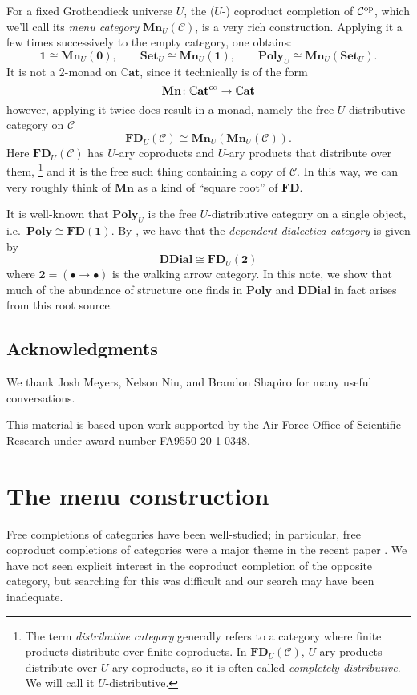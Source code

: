 \documentclass[11pt, one side, article]{memoir}
\theoremstyle{definition}
\theoremstyle{plain}
\newcommand{\cat}[1]{\mathcal{#1}}%
\newcommand{\Cat}[1]{\mathbf{#1}}%
\newcommand{\op}{^\tn{op}}
\newcommand{\co}{^\tn{co}}
\newcommand{\tn}[1]{\textnormal{#1}}
\newcommand{\smset}{\Cat{Set}}
\newcommand{\smcat}{\mathbb{C}\Cat{at}}
\newcommand{\poly}{\Cat{Poly}}
\newcommand{\0}{\textsf{0}}
\newcommand{\1}{\tn{\textsf{1}}}
\newcommand{\2}{\tn{\textsf{2}}}
\newcommand{\3}{\tn{\textsf{3}}}
\newcommand{\4}{\tn{\textsf{4}}}
\newcommand{\5}{\tn{\textsf{5}}}
\newcommand{\6}{\tn{\textsf{6}}}
\newcommand{\7}{\tn{\textsf{7}}}
\newcommand{\8}{\tn{\textsf{8}}}
\newcommand{\9}{\tn{\textsf{9}}}
\newcommand{\fd}{\Cat{FD}}
\newcommand{\mn}{\Cat{Mn}}
\newcommand{\ddial}{\Cat{DDial}}
\begin{document}
For a fixed Grothendieck universe $U$, the ($U$-) coproduct completion of $\cat{C}\op$, which we'll call its \emph{menu category} $\mn_U(\cat{C})$, is a very rich construction. Applying it a few times successively to the empty category, one obtains:
\[
	\Cat{1}\cong \mn_U(\Cat{0}),\qquad
	\smset_U\cong\mn_U(\Cat{1}),\qquad
	\poly_U\cong\mn_U(\smset_U).
\]
It is not a 2-monad on $\smcat$, since it technically is of the form
\[
\mn\colon\smcat\co\to\smcat
\]
however, applying it twice does result in a monad, namely the free $U$-distributive category on $\cat{C}$
\[
\fd_U(\cat{C})\cong\mn_U(\mn_U(\cat{C})).
\]
Here $\fd_U(\cat{C})$ has $U$-ary coproducts and $U$-ary products that distribute over them,%
\footnote{The term \emph{distributive category} generally refers to a category where finite products distribute over finite coproducts. In $\fd_U(\cat{C})$, $U$-ary products distribute over $U$-ary coproducts, so it is often called \emph{completely distributive}. We will call it $U$-distributive.}
 and it is the free such thing containing a copy of $\cat{C}$. In this way, we can very roughly think of $\mn$ as a kind of ``square root'' of $\fd$. 

It is well-known that $\poly_U$ is the free $U$-distributive category on a single object, i.e.\ $\poly\cong\fd(\Cat{1})$. By \cite{moss2018dialectica}, we have that the \emph{dependent dialectica category} is given by 
\[\ddial\cong\fd_U(\Cat{2})\]
where $\Cat{2}=(\bullet\to\bullet)$ is the walking arrow category. In this note, we show that much of the abundance of structure one finds in $\poly$ and $\ddial$ in fact arises from this root source.

\section*{Acknowledgments}
We thank Josh Meyers, Nelson Niu, and Brandon Shapiro for many useful conversations.  

This material is based upon work supported by the Air Force Office of Scientific Research under award number FA9550-20-1-0348.


\chapter{The menu construction}

Free completions of categories have been well-studied; in particular, free coproduct completions of categories were a major theme in the recent paper \cite{adamek2020nice}. We have not seen explicit interest in the coproduct completion of the opposite category, but searching for this was difficult and our search may have been inadequate.
\end{document}
